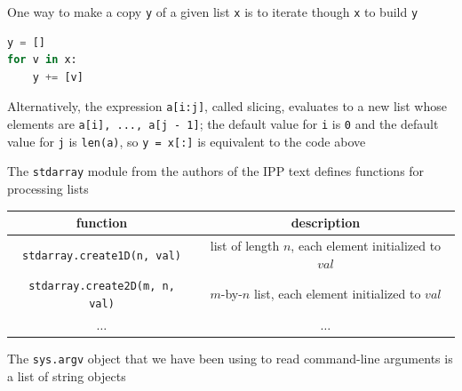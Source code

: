 \documentclass[8pt,a4paper,compress]{beamer}
\begin{document}
\begin{frame}[fragile]
\pause

One way to make a copy \lstinline{y} of a given list \lstinline{x} is to iterate though \lstinline{x} to build \lstinline{y}
\begin{lstlisting}[language=Python]
y = []
for v in x:
    y += [v]
\end{lstlisting}

\pause
\bigskip

Alternatively, the expression \lstinline{a[i:j]}, called slicing,  evaluates to a new list whose elements are \lstinline{a[i], ..., a[j - 1]}; the default value for \lstinline{i} is \lstinline{0} and the default value for \lstinline{j} is \lstinline{len(a)}, so \lstinline{y = x[:]} is equivalent to the code above

\pause
\bigskip

The \lstinline{stdarray} module from the authors of the IPP text defines functions for processing lists

\begin{center}
\begin{tabular}{cc}
function & description \\ \hline
\lstinline$stdarray.create1D(n, val)$ & list of length $n$, each element initialized to $val$ \\
\lstinline$stdarray.create2D(m, n, val)$ & $m$-by-$n$ list, each element initialized to $val$ \\
$\dots$ & $\dots$
\end{tabular} 
\end{center}

\pause
\bigskip

The \lstinline{sys.argv} object that we have been using to read command-line arguments is a list of string objects
\end{frame}
\end{document}
